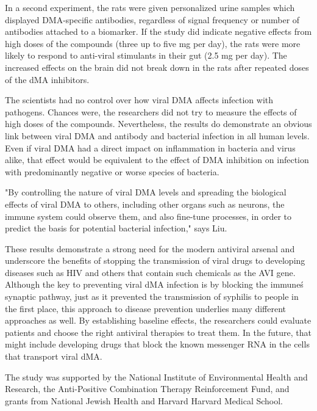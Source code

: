 \documentclass{article}
\begin{document}
In a second experiment, the rats were given personalized urine samples which displayed DMA-specific antibodies, regardless of signal frequency or number of antibodies attached to a biomarker. If the study did indicate negative effects from high doses of the compounds (three up to five mg per day), the rats were more likely to respond to anti-viral stimulants in their gut (2.5 mg per day). The increased effects on the brain did not break down in the rats after repeated doses of the dMA inhibitors.

The scientists had no control over how viral DMA affects infection with pathogens. Chances were, the researchers did not try to measure the effects of high doses of the compounds. Nevertheless, the results do demonstrate an obvious link between viral DMA and antibody and bacterial infection in all human levels. Even if viral DMA had a direct impact on inflammation in bacteria and virus alike, that effect would be equivalent to the effect of DMA inhibition on infection with predominantly negative or worse species of bacteria.

"By controlling the nature of viral DMA levels and spreading the biological effects of viral DMA to others, including other organs such as neurons, the immune system could observe them, and also fine-tune processes, in order to predict the basis for potential bacterial infection," says Liu.

These results demonstrate a strong need for the modern antiviral arsenal and underscore the benefits of stopping the transmission of viral drugs to developing diseases such as HIV and others that contain such chemicals as the AVI gene. Although the key to preventing viral dMA infection is by blocking the immune\'s synaptic pathway, just as it prevented the transmission of syphilis to people in the first place, this approach to disease prevention underlies many different approaches as well. By establishing baseline effects, the researchers could evaluate patients and choose the right antiviral therapies to treat them. In the future, that might include developing drugs that block the known messenger RNA in the cells that transport viral dMA.

The study was supported by the National Institute of Environmental Health and Research, the Anti-Positive Combination Therapy Reinforcement Fund, and grants from National Jewish Health and Harvard Harvard Medical School.
\end{document}

